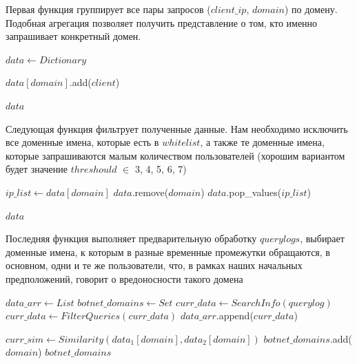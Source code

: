 \documentclass[14pt]{extreport} %
\begin{document}
Первая функция группирует все пары запросов ($client\_ip$, $domain$) по домену. Подобная агрегация позволяет получить представление о том, кто именно запрашивает конкретный домен.
\begin{algorithmic}
	\State $data\gets Dictionary$
			
	\State $data[domain]$.add($client$)
	\EndFor
			
	\State \Return $data$
	\EndFunction
\end{algorithmic}

Следующая функция фильтрует полученные данные. Нам необходимо исключить все доменные имена, которые есть в $whitelist$, а также те доменные имена, которые запрашиваются малым количеством пользователей (хорошим вариантом будет значение $threshould$ $\in$ 3, 4, 5, 6, 7)
	

\begin{algorithmic}
	\State $ip\_list\gets data[domain]$
	\State $data$.remove($domain$)
	\State $data$.pop\_values($ip\_list$)
	\EndIf
				
				
	\EndFor
	\State \Return $data$
	\EndFunction
\end{algorithmic}
	
Последняя функция выполняет предварительную обработку $querylogs$, выбирает доменные имена, к которым в разные временные промежутки обращаются, в основном, одни и те же пользователи, что, в рамках наших начальных предположений, говорит о вредоносности такого домена
\begin{algorithmic}
	\State $data\_arr\gets List$
	\State $botnet\_domains\gets Set$
	\State $curr\_data\gets SearchInfo(querylog)$
	\State $curr\_data\gets FilterQueries(curr\_data)$
	\State $data\_arr$.append($curr\_data$)
		
	\EndFor
	\State $curr\_sim\gets Similarity(data_1[domain], data_2[domain])$
	\State $botnet\_domains$.add($domain$)
	\EndIf
	\EndFor
	\EndIf
	\EndFor
	\EndFor
	\State \Return $botnet\_domains$
	\EndFunction
\end{algorithmic}
	
\end{document}
